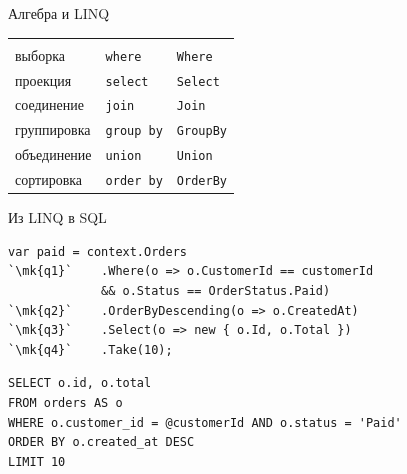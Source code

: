 \documentclass[aspectratio=169,10pt,t]{beamer}
\newcommand{\codesm}{\ttfamily\fontsize{7.6}{9.0}\selectfont}
\newcommand{\mk}[1]{\tikz[remember picture,overlay]\coordinate (#1) at (0,0.55ex);}
\begin{document}
\begin{frame}{Алгебра и LINQ}
  \slidetop

  {\renewcommand{\arraystretch}{1.25}\small
  \begin{tabular}{@{}L{4.2cm}L{4.2cm}L{4.2cm}@{}}
     &  &  \\
    выборка     & \texttt{where}    & \texttt{Where} \\
    проекция    & \texttt{select}   & \texttt{Select} \\
    соединение  & \texttt{join}     & \texttt{Join} \\
    группировка & \texttt{group by} & \texttt{GroupBy} \\
    объединение & \texttt{union}    & \texttt{Union} \\
    сортировка  & \texttt{order by} & \texttt{OrderBy} \\
  \end{tabular}}

\end{frame}

\begin{frame}[fragile]{Из LINQ в SQL}
  \vspace{0.3em}
\begin{lstlisting}[style=csharp,basicstyle=\codesm,escapechar=`]
var paid = context.Orders
`\mk{q1}`    .Where(o => o.CustomerId == customerId
             && o.Status == OrderStatus.Paid)
`\mk{q2}`    .OrderByDescending(o => o.CreatedAt)
`\mk{q3}`    .Select(o => new { o.Id, o.Total })
`\mk{q4}`    .Take(10);
\end{lstlisting}
  \vspace{-1.2em}

\begin{lstlisting}[style=plain,basicstyle=\codesm]
SELECT o.id, o.total
FROM orders AS o
WHERE o.customer_id = @customerId AND o.status = 'Paid'
ORDER BY o.created_at DESC
LIMIT 10
\end{lstlisting}

\end{frame}
\end{document}
